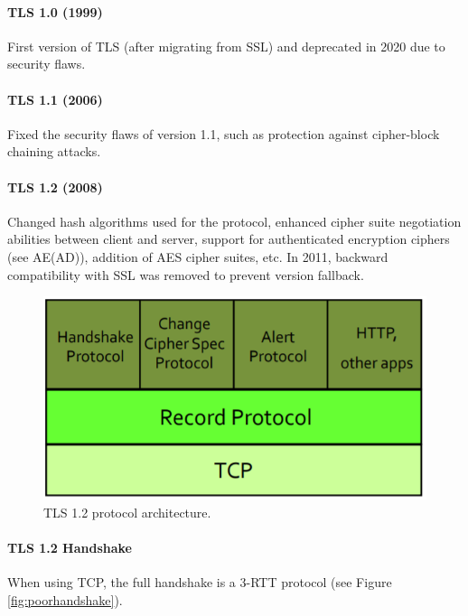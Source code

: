 \paragraph{TLS 1.0 (1999)}
First version of TLS (after migrating from SSL) and deprecated in 2020 due to security flaws.

\paragraph{TLS 1.1 (2006)}
Fixed the security flaws of version 1.1, such as protection against cipher-block chaining attacks.

\paragraph{TLS 1.2 (2008)}
Changed hash algorithms used for the protocol, enhanced cipher suite negotiation abilities between client and server, support for authenticated encryption ciphers (see AE(AD)), addition of AES cipher suites, etc.
In 2011, backward compatibility with SSL was removed to prevent version fallback.

\begin{figure}[h]
	\centering
	\includegraphics[scale=0.4]{images/3-tls12.PNG}
	\caption{TLS 1.2 protocol architecture.}
	\label{fig:tls12}
\end{figure}

\paragraph{TLS 1.2 Handshake}
When using TCP, the full handshake is a 3-RTT protocol (see Figure \ref{fig:poorhandshake}). 

